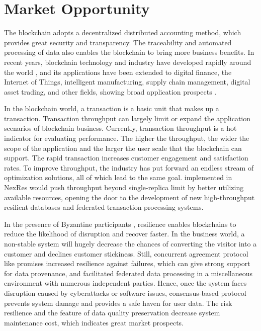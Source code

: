 \section{Market Opportunity}
\par The blockchain adopts a decentralized distributed accounting method, which provides great security 
and transparency. The traceability and automated processing of data also enables the blockchain to 
bring more business benefits. In recent years, blockchain technology and industry have developed 
rapidly around the world \cite{bitcoin, ethereum, hotstuff}, and its applications have been extended 
to digital finance, the Internet of Things, intelligent manufacturing, supply chain management, digital 
asset trading, and other fields, showing broad application prospects \cite{gupta2021fault}.

\par In the blockchain world, a transaction is a basic unit that makes up a transaction. Transaction 
throughput can largely limit or expand the application scenarios of blockchain business. Currently, 
transaction throughput is a hot indicator for evaluating performance. The higher the throughput, 
the wider the scope of the application and the larger the user scale that the blockchain can support. 
The rapid transaction increases customer engagement and satisfaction rates. To improve throughput, 
the industry has put forward an endless stream of optimization solutions, all of which lead to the same 
goal. \RCC{} \cite{rcc} implemented in NexRes would push throughput beyond single-replica limit by better 
utilizing available resources, opening the door to the development of new high-throughput resilient 
databases and federated transaction processing systems.

\par In the presence of Byzantine participants \cite{lao2020survey}, resilience enables blockchains to 
reduce the likelihood of disruption and recover faster. In the business 
world, a non-stable system will hugely decrease the chances of converting the visitor into a customer 
and declines customer stickiness. Still, concurrent agreement protocol like \RCC{} promises increased 
resilience against failures, which can give strong support for data provenance, and facilitated federated 
data processing in a miscellaneous environment with numerous independent parties. Hence, once the system 
faces disruption caused by cyberattacks or software issues, consensus-based protocol prevents system damage 
and provides a safe haven for user data. The risk resilience and the feature of data quality preservation 
decrease system maintenance cost, which indicates great market prospects.
